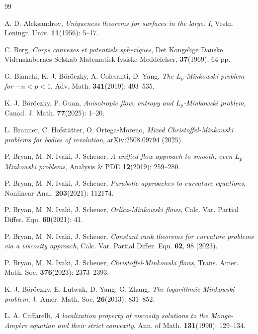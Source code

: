 \documentclass[12pt]{amsart}
\numberwithin{equation}{section}
\newcommand{\8}{\infty}
\begin{document}
\begin{thebibliography}{99}

A. D. Aleksandrov, \textit{Uniqueness theorems for surfaces in the large. I}, Vestn. Leningr. Univ. \textbf{11}(1956): 5--17.

C. Berg, \textit{Corps convexes et potentiels spher\'{i}ques}, Det Kongelige Danske Videnskabernes Selskab Matematisk-fysiske Meddelelser, \textbf{37}(1969), 64 pp.

G. Bianchi, K. J. B{\"{o}}r{\"{o}}czky, A. Colesanti, D. Yang, \textit{The $L_p$-Minkowski problem for $-n < p < 1$}, Adv. Math. \textbf{341}(2019): 493--535.

K. J. B{\"{o}}r{\"{o}}czky, P. Guan, \textit{Anisotropic flow, entropy and $L_p$-Minkowski problem}, Canad. J. Math. \textbf{77}(2025): 1--20.

 L. Brauner, C. Hofst\"atter, O. Ortega-Moreno, \textit{Mixed Christoffel-Minkowski problems for bodies of revolution}, arXiv:2508.09794 (2025).

P. Bryan, M. N. Ivaki, J. Scheuer, \textit{A unified flow approach to smooth, even $L_p$-Minkowski problems}, Analysis \& PDE \textbf{12}(2019): 259--280.

P. Bryan, M. N. Ivaki, J. Scheuer, \textit{Parabolic approaches to curvature equations}, Nonlinear Anal. \textbf{203}(2021): 112174.

 P. Bryan, M. N. Ivaki, J. Scheuer, \textit{Orlicz-Minkowski flows}, Calc. Var. Partial Differ. Equ. \textbf{60}(2021): 41.

P. Bryan, M. N. Ivaki, J. Scheuer, \textit{Constant rank theorems for curvature problems via a viscosity approach}, Calc. Var. Partial Differ. Equ. \textbf{62}, 98 (2023).

P. Bryan, M. N. Ivaki, J. Scheuer, \textit{Christoffel-Minkowski flows}, Trans. Amer. Math. Soc. \textbf{376}(2023): 2373--2393.

K. J. B{\"o}r{\"o}czky, E. Lutwak, D. Yang, G. Zhang, \textit{The logarithmic Minkowski problem}, J. Amer. Math. Soc. \textbf{26}(2013): 831--852.

L. A. Caffarelli,
\textit{A localization property of viscosity solutions to the Monge-Amp\`ere equation and their strict convexity}, Ann. of Math. \textbf{131}(1990): 129--134.


\end{thebibliography}
\end{document}
